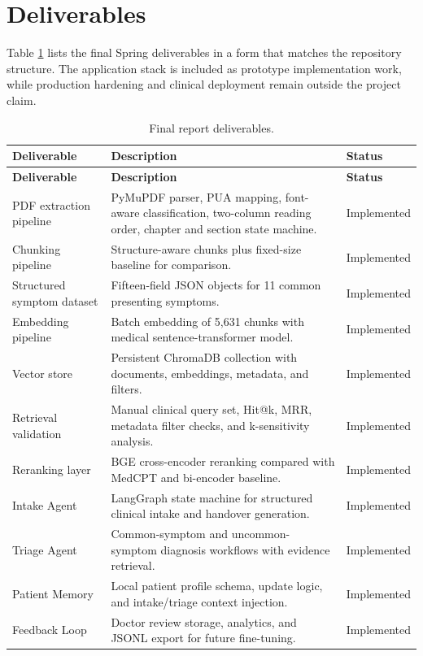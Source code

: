 \section{Deliverables}

Table \ref{tab:deliverables} lists the final Spring deliverables in a form that matches the repository structure. The application stack is included as prototype implementation work, while production hardening and clinical deployment remain outside the project claim.

\begin{longtable}{p{} p{} p{}}
\caption{Final report deliverables.}
\label{tab:deliverables}\\
\toprule
\textbf{Deliverable} & \textbf{Description} & \textbf{Status}\\
\midrule
\endfirsthead
\toprule
\textbf{Deliverable} & \textbf{Description} & \textbf{Status}\\
\midrule
\endhead
PDF extraction pipeline & PyMuPDF parser, PUA mapping, font-aware classification, two-column reading order, chapter and section state machine. & Implemented\\
Chunking pipeline & Structure-aware chunks plus fixed-size baseline for comparison. & Implemented\\
Structured symptom dataset & Fifteen-field JSON objects for 11 common presenting symptoms. & Implemented\\
Embedding pipeline & Batch embedding of 5,631 chunks with medical sentence-transformer model. & Implemented\\
Vector store & Persistent ChromaDB collection with documents, embeddings, metadata, and filters. & Implemented\\
Retrieval validation & Manual clinical query set, Hit@k, MRR, metadata filter checks, and k-sensitivity analysis. & Implemented\\
Reranking layer & BGE cross-encoder reranking compared with MedCPT and bi-encoder baseline. & Implemented\\
Intake Agent & LangGraph state machine for structured clinical intake and handover generation. & Implemented\\
Triage Agent & Common-symptom and uncommon-symptom diagnosis workflows with evidence retrieval. & Implemented\\
Patient Memory & Local patient profile schema, update logic, and intake/triage context injection. & Implemented\\
Feedback Loop & Doctor review storage, analytics, and JSONL export for future fine-tuning. & Implemented\\

\end{longtable}
